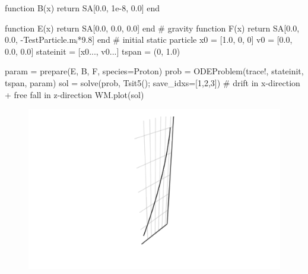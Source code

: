 \documentclass[
  a4paper,
  DIV=11]{scrreprt}
\newenvironment{Shaded}{\begin{snugshade}}{\end{snugshade}}
\newcommand{\CommentTok}[1]{\textcolor[rgb]{0.37,0.37,0.37}{#1}}
\newcommand{\ControlFlowTok}[1]{\textcolor[rgb]{0.00,0.23,0.31}{#1}}
\newcommand{\FloatTok}[1]{\textcolor[rgb]{0.68,0.00,0.00}{#1}}
\newcommand{\FunctionTok}[1]{\textcolor[rgb]{0.28,0.35,0.67}{#1}}
\newcommand{\KeywordTok}[1]{\textcolor[rgb]{0.00,0.23,0.31}{#1}}
\newcommand{\NormalTok}[1]{\textcolor[rgb]{0.00,0.23,0.31}{#1}}
\newcommand{\OperatorTok}[1]{\textcolor[rgb]{0.37,0.37,0.37}{#1}}
\begin{document}
\begin{Shaded}
\begin{Highlighting}[]
\KeywordTok{function} \FunctionTok{B}\NormalTok{(x)}
    \ControlFlowTok{return}\NormalTok{ SA[}\FloatTok{0.0}\NormalTok{, }\FloatTok{1e{-}8}\NormalTok{, }\FloatTok{0.0}\NormalTok{]}
\KeywordTok{end}

\KeywordTok{function} \FunctionTok{E}\NormalTok{(x)}
    \ControlFlowTok{return}\NormalTok{ SA[}\FloatTok{0.0}\NormalTok{, }\FloatTok{0.0}\NormalTok{, }\FloatTok{0.0}\NormalTok{]}
\KeywordTok{end}
\CommentTok{\# gravity}
\KeywordTok{function} \FunctionTok{F}\NormalTok{(x)}
    \ControlFlowTok{return}\NormalTok{ SA[}\FloatTok{0.0}\NormalTok{, }\FloatTok{0.0}\NormalTok{, }\OperatorTok{{-}}\NormalTok{TestParticle.mᵢ}\OperatorTok{*}\FloatTok{9.8}\NormalTok{]}
\KeywordTok{end}
\CommentTok{\# initial static particle}
\NormalTok{x0 }\OperatorTok{=}\NormalTok{ [}\FloatTok{1.0}\NormalTok{, }\FloatTok{0}\NormalTok{, }\FloatTok{0}\NormalTok{]}
\NormalTok{v0 }\OperatorTok{=}\NormalTok{ [}\FloatTok{0.0}\NormalTok{, }\FloatTok{0.0}\NormalTok{, }\FloatTok{0.0}\NormalTok{]}
\NormalTok{stateinit }\OperatorTok{=}\NormalTok{ [x0}\OperatorTok{...}\NormalTok{, v0}\OperatorTok{...}\NormalTok{]}
\NormalTok{tspan }\OperatorTok{=}\NormalTok{ (}\FloatTok{0}\NormalTok{, }\FloatTok{1.0}\NormalTok{)}

\NormalTok{param }\OperatorTok{=} \FunctionTok{prepare}\NormalTok{(E, B, F, species}\OperatorTok{=}\NormalTok{Proton)}
\NormalTok{prob }\OperatorTok{=} \FunctionTok{ODEProblem}\NormalTok{(trace!, stateinit, tspan, param)}
\NormalTok{sol }\OperatorTok{=} \FunctionTok{solve}\NormalTok{(prob, }\FunctionTok{Tsit5}\NormalTok{(); save\_idxs}\OperatorTok{=}\NormalTok{[}\FloatTok{1}\NormalTok{,}\FloatTok{2}\NormalTok{,}\FloatTok{3}\NormalTok{])}
\CommentTok{\# drift in x{-}direction + free fall in z{-}direction}
\NormalTok{WM.}\FunctionTok{plot}\NormalTok{(sol)}
\end{Highlighting}
\end{Shaded}

\begin{figure}[H]

{\centering \includegraphics{./Tutorial_files/figure-pdf/cell-6-output-1.png}

}

\end{figure}
\end{document}
